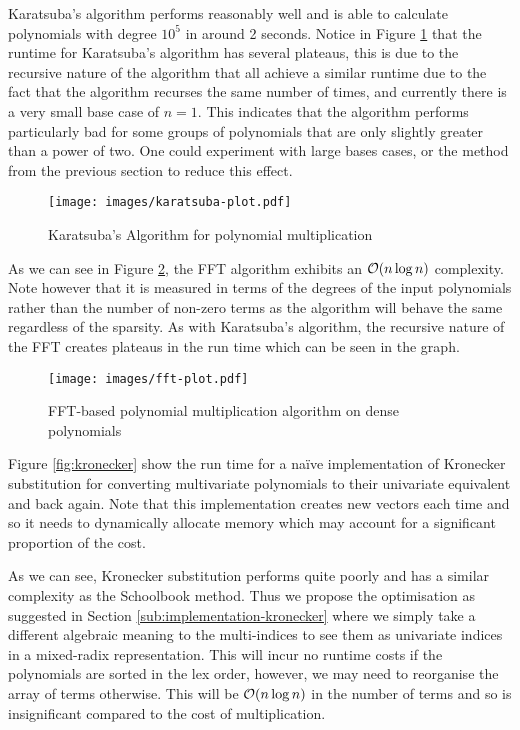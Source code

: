 \medskip


Karatsuba's algorithm performs reasonably well and is able to calculate polynomials with degree $10^5$ in around 2 seconds. Notice  in Figure \ref{fig:karatsuba} that the runtime for Karatsuba's algorithm has several plateaus, this is due to the recursive nature of the algorithm that all achieve a similar runtime due to the fact that the algorithm recurses the same number of times, and currently there is a very small base case of $n = 1$. This indicates that the algorithm performs particularly bad for some groups of polynomials that are only slightly greater than a power of two. One could experiment with large bases cases, or the method from the previous section to reduce this effect.

\begin{figure}[h!]
    \centering
    \texttt{[image: images/karatsuba-plot.pdf]}
    \caption{Karatsuba's Algorithm for polynomial multiplication}
    \label{fig:karatsuba}
\end{figure}

As we can see in Figure \ref{fig:fft}, the FFT algorithm exhibits an $\mathcal O(n \log n)$ complexity. Note however that it is measured in terms of the degrees of the input polynomials rather than the number of non-zero terms as the algorithm will behave the same regardless of the sparsity. As with Karatsuba's algorithm, the recursive nature of the FFT creates plateaus in the run time which can be seen in the graph.

\begin{figure}[h!]
    \centering
    \texttt{[image: images/fft-plot.pdf]}
    \caption{FFT-based polynomial multiplication algorithm on dense polynomials}
    \label{fig:fft}
\end{figure}

\medskip

\medskip

Figure \ref{fig:kronecker} show the run time for a na\"{i}ve implementation of Kronecker substitution for converting multivariate polynomials to their univariate equivalent and back again. Note that this implementation creates new vectors each time and so it needs to dynamically allocate memory which may account for a significant proportion of the cost.

As we can see, Kronecker substitution performs quite poorly and has a similar complexity as the Schoolbook method. Thus we propose the optimisation as suggested in Section \ref{sub:implementation-kronecker} where we simply take a different algebraic meaning to the multi-indices to see them as univariate indices in a mixed-radix representation. This will incur no runtime costs if the polynomials are sorted in the lex order, however, we may need to reorganise the array of terms otherwise. This will be $\mathcal O(n \log n)$ in the number of terms and so is insignificant compared to the cost of multiplication.


